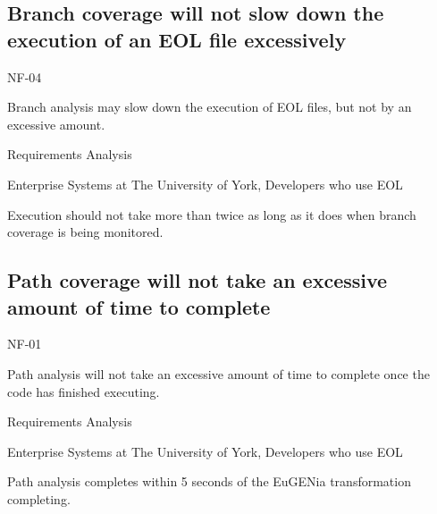 \subsection{Branch coverage will not slow down the execution of an EOL file excessively}
\begin{description}[style=sameline,leftmargin=4.5cm,nolistsep]
\item[\hspace*{0.3cm}Label] NF-04
\item[\hspace*{0.3cm}Description] Branch analysis may slow down the execution of EOL files, but not by an excessive amount.
\item[\hspace*{0.3cm}Source] Requirements Analysis
\item[\hspace*{0.3cm}Stakeholders] Enterprise Systems at The University of York, Developers who use EOL
\item[\hspace*{0.3cm}Satisfiable Conditions] Execution should not take more than twice as long as it does when branch coverage is being monitored.
\end{description}

\subsection{Path coverage will not take an excessive amount of time to complete}
\begin{description}[style=sameline,leftmargin=4.5cm,nolistsep]
\item[\hspace*{0.3cm}Label] NF-01
\item[\hspace*{0.3cm}Description] Path analysis will not take an excessive amount of time to complete once the code has finished executing.
\item[\hspace*{0.3cm}Source] Requirements Analysis
\item[\hspace*{0.3cm}Stakeholders] Enterprise Systems at The University of York, Developers who use EOL
\item[\hspace*{0.3cm}Satisfiable Conditions] Path analysis completes within 5 seconds of the EuGENia transformation completing.
\end{description}

